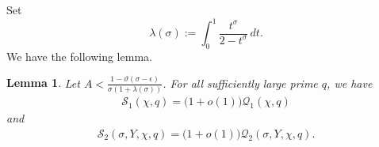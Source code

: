 \documentclass[12pt]{amsart}
\numberwithin{equation}{section}
\theoremstyle{plain}
\newtheorem{lem}{Lemma}
\theoremstyle{remark}
\theoremstyle{definition}
\theoremstyle{remark}
\begin{document}
Set
\[
\lambda(\sigma):=\int_0^1\frac{t^{\sigma}}{2-t^{\sigma}}\,dt.
\]
We have the following lemma.
\begin{lem}\label{formula-logarithmic-Z1-Q1}
Let $A<\frac{1-\vartheta(\sigma-\epsilon)}{\sigma(1+\lambda(\sigma))}$. For all sufficiently large prime $q$, we have
\begin{equation}\label{formula-S1-Q1}
\begin{aligned}
\mathcal{S}_1(\chi,q)=\big(1+o(1)\big)\mathcal{Q}_1(\chi,q)
\end{aligned}
\end{equation}
and
\begin{equation}\label{formula-S2-Q2}
\begin{aligned}
\mathcal{S}_2(\sigma,Y,\chi,q)=\big(1+o(1)\big)\mathcal{Q}_2(\sigma,Y,\chi,q).
\end{aligned}
\end{equation}
\end{lem}
\end{document}
